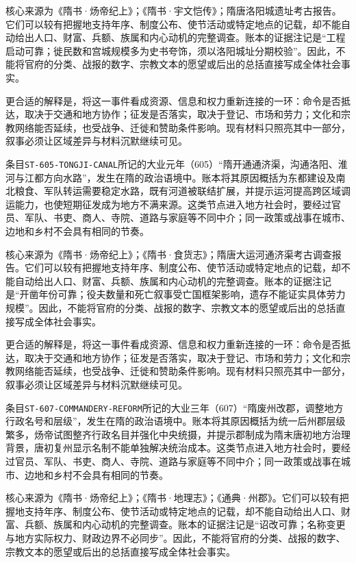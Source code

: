 核心来源为《隋书·炀帝纪上》；《隋书·宇文恺传》；隋唐洛阳城遗址考古报告。它们可以较有把握地支持年序、制度公布、使节活动或特定地点的记载，却不能自动给出人口、财富、兵额、族属和内心动机的完整调查。账本的证据注记是“工程启动可靠；徙民数和宫城规模多为史书夸饰，须以洛阳城址分期校验”。因此，不能将官府的分类、战报的数字、宗教文本的愿望或后出的总括直接写成全体社会事实。

更合适的解释是，将这一事件看成资源、信息和权力重新连接的一环：命令是否抵达，取决于交通和地方协作；征发是否落实，取决于登记、市场和劳力；文化和宗教网络能否延续，也受战争、迁徙和赞助条件影响。现有材料只照亮其中一部分，叙事必须让区域差异与材料沉默继续可见。


条目\texttt{ST-605-TONGJI-CANAL}所记的大业元年（605）“隋开通通济渠，沟通洛阳、淮河与江都方向水路”，发生在隋的政治语境中。账本将其原因概括为东都建设及南北粮食、军队转运需要稳定水路，既有河道被联结扩展，并提示运河提高跨区域调运能力，也使短期征发成为地方不满来源。这类节点进入地方社会时，要经过官员、军队、书吏、商人、寺院、道路与家庭等不同中介；同一政策或战事在城市、边地和乡村不会具有相同的节奏。

核心来源为《隋书·炀帝纪上》；《隋书·食货志》；隋唐大运河通济渠考古调查报告。它们可以较有把握地支持年序、制度公布、使节活动或特定地点的记载，却不能自动给出人口、财富、兵额、族属和内心动机的完整调查。账本的证据注记是“开凿年份可靠；役夫数量和死亡叙事受亡国框架影响，遗存不能证实具体劳力规模”。因此，不能将官府的分类、战报的数字、宗教文本的愿望或后出的总括直接写成全体社会事实。

更合适的解释是，将这一事件看成资源、信息和权力重新连接的一环：命令是否抵达，取决于交通和地方协作；征发是否落实，取决于登记、市场和劳力；文化和宗教网络能否延续，也受战争、迁徙和赞助条件影响。现有材料只照亮其中一部分，叙事必须让区域差异与材料沉默继续可见。


条目\texttt{ST-607-COMMANDERY-REFORM}所记的大业三年（607）“隋废州改郡，调整地方行政名号和层级”，发生在隋的政治语境中。账本将其原因概括为统一后州郡层级繁多，炀帝试图整齐行政名目并强化中央统摄，并提示郡制成为隋末唐初地方治理背景，唐初复州显示名制不能单独解决统治成本。这类节点进入地方社会时，要经过官员、军队、书吏、商人、寺院、道路与家庭等不同中介；同一政策或战事在城市、边地和乡村不会具有相同的节奏。

核心来源为《隋书·炀帝纪上》；《隋书·地理志》；《通典·州郡》。它们可以较有把握地支持年序、制度公布、使节活动或特定地点的记载，却不能自动给出人口、财富、兵额、族属和内心动机的完整调查。账本的证据注记是“诏改可靠；名称变更与地方实际权力、财政边界不必同步”。因此，不能将官府的分类、战报的数字、宗教文本的愿望或后出的总括直接写成全体社会事实。


